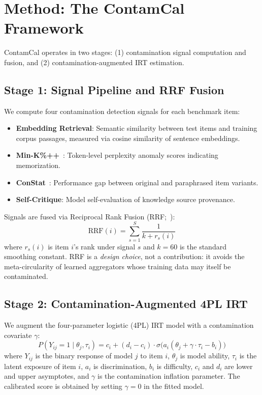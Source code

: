 \documentclass[letterpaper,11pt]{article}
\begin{document}
\section{Method: The ContamCal Framework}
\label{sec:method}

ContamCal operates in two stages: (1) contamination signal computation and fusion, and (2) contamination-augmented IRT estimation.

\subsection{Stage 1: Signal Pipeline and RRF Fusion}

We compute four contamination detection signals for each benchmark item:
\begin{itemize}
\item \textbf{Embedding Retrieval}: Semantic similarity between test items and training corpus passages, measured via cosine similarity of sentence embeddings.
\item \textbf{Min-K\%++}~\citep{shi2024detecting}: Token-level perplexity anomaly scores indicating memorization.
\item \textbf{ConStat}~\citep{dekoninck2024constat}: Performance gap between original and paraphrased item variants.
\item \textbf{Self-Critique}: Model self-evaluation of knowledge source provenance.
\end{itemize}

Signals are fused via Reciprocal Rank Fusion (RRF;~\citealp{cormack2009reciprocal}):
\begin{equation}
\text{RRF}(i) = \sum_{s=1}^{S} \frac{1}{k + r_s(i)}
\label{eq:rrf}
\end{equation}
where $r_s(i)$ is item $i$'s rank under signal $s$ and $k=60$ is the standard smoothing constant.
RRF is a \emph{design choice}, not a contribution: it avoids the meta-circularity of learned aggregators whose training data may itself be contaminated.

\subsection{Stage 2: Contamination-Augmented 4PL IRT}

We augment the four-parameter logistic (4PL) IRT model with a contamination covariate $\gamma$:
\begin{equation}
P(Y_{ij}=1 \mid \theta_j, \tau_i) = c_i + (d_i - c_i) \cdot \sigma\!\big(a_i(\theta_j + \gamma \cdot \tau_i - b_i)\big)
\label{eq:4pl_gamma}
\end{equation}
where $Y_{ij}$ is the binary response of model $j$ to item $i$, $\theta_j$ is model ability, $\tau_i$ is the latent exposure of item $i$, $a_i$ is discrimination, $b_i$ is difficulty, $c_i$ and $d_i$ are lower and upper asymptotes, and $\gamma$ is the contamination inflation parameter.
The calibrated score is obtained by setting $\gamma=0$ in the fitted model.
\end{document}
